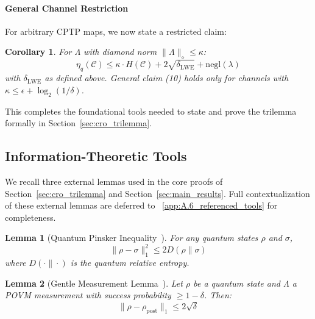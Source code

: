 \documentclass[preprint,12pt]{elsarticle}
\newtheorem{lemma}{Lemma}[section]
\newtheorem{corollary}{Corollary}[section]
\newcommand{\negl}{\mathrm{negl}}
\begin{document}
            \paragraph{General Channel Restriction}
            For arbitrary CPTP maps, we now state a restricted claim:
            \begin{corollary}\label{cor:general_channel_bound}
                For $\Lambda$ with diamond norm $\|\Lambda\|_\diamond \leq \kappa$:
                \begin{equation}\label{eq:general_chan_restr}
                    \eta_q(\mathcal{C}) \leq \kappa \cdot H(\mathcal{C}) + 2\sqrt{\delta_{\text{LWE}}} + \negl(\lambda)
                \end{equation}
                with $\delta_{\text{LWE}}$ as defined above. General claim (10) holds \textit{only} for channels with $\kappa \leq \epsilon + \log_2(1/\delta)$.
            \end{corollary}
            This completes the foundational tools needed to state and prove the trilemma formally in Section~\ref{sec:cro_trilemma}.
        \subsection{Information-Theoretic Tools}\label{subsec:info_tools}

            We recall three external lemmas used in the core proofs of Section~\ref{sec:cro_trilemma} and Section~\ref{sec:main_results}. Full contextualization of these external lemmas are deferred to ~\ref{app:A.6_referenced_tools} for completeness.

            \begin{lemma}[Quantum Pinsker Inequality~{\cite[Thm 11.9.1]{Wilde2017}}]\label{lem:pinsker}
                For any quantum states $\rho$ and $\sigma$,
                \[
                \|\rho - \sigma\|_1^2 \leq 2 D(\rho \| \sigma)
                \]
                where $D(\cdot\|\cdot)$ is the quantum relative entropy.
            \end{lemma}

            \begin{lemma}[Gentle Measurement Lemma~{\cite[Lemma 9.4.1]{Wilde2017}}]\label{lem:gentle}
                Let $\rho$ be a quantum state and $\Lambda$ a POVM measurement with success probability $\geq 1 - \delta$. Then:
                \[
                \|\rho - \rho_{\text{post}}\|_1 \leq 2\sqrt{\delta}
                \]
            \end{lemma}
\end{document}
